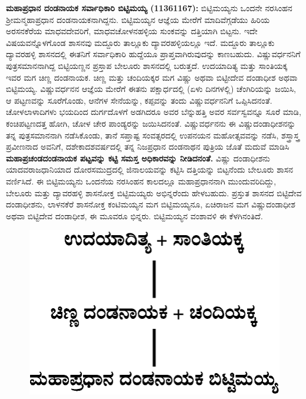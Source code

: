\textbf{ಮಹಾಪ್ರಧಾನ ದಂಡನಾಯಕ ಸರ್ವಾಧಿಕಾರಿ ಬಿಟ್ಟಿಮಯ್ಯ (1136\general{\enginline{-}}1167):} ಬಿಟ್ಟಿಮಯ್ಯನು ಒಂದನೇ ನರಸಿಂಹನ ಶ‍್ರೀಮನ್ಮಹಾಪ್ರಧಾನ ದಂಡನಾಯಕನಾಗಿದ್ದನು. ಬಿಟ್ಟಿಮಯ್ಯನ ಆಜ್ಞೆಯ ಮೇರೆಗೆ ಮಾದಿವೆಗ್ಗಡೆಯು ಹಿರಿಯ ಅರಸನಕೆರೆಯ ಮಾಧವದೇವರಿಗೆ, ಮಾಧವಚೋಳನಹಳ್ಳಿಯ ಸುಂಕವನ್ನು ದತ್ತಿಯಾಗಿ ಬಿಟ್ಟನು. ಇದೇ ವಿಷಯವನ್ನೊಳಗೊಂಡ ಶಾಸನವು ಮದ್ದೂರು ತಾಲ್ಲೂಕು ದ್ಯಾವರಹಳ್ಳಿಯಲ್ಲೂ ಇದೆ. ಮದ್ದೂರು ತಾಲ್ಲೂಕು ದ್ಯಾವರಹಳ್ಳಿ ಶಾಸನದಲ್ಲಿ ಈತನಿಗೆ ಸರ್ವಾಧಿಕಾರಿ ಹುದ್ದೆಯೂ ಪ್ರಾಪ್ತವಾಗಿರುವುದನ್ನು ಕಾಣಬಹುದು. ವಿಷ್ಣುವರ್ಧನನಿಗೆ ಪುತ್ರಸಮಾನನಾಗಿದ್ದ ಬಿಟ್ಟಿಯಣ್ಣನ ಪ್ರಸ್ತಾಪ ಬೇಲೂರು ಶಾಸನದಲ್ಲಿ ಬರುತ್ತದೆ. ಉದಯಾದಿತ್ಯ ಮತ್ತು ಸಾಂತಿಯಕ್ಕ ಇವರ ಮಗ ಚಿಣ್ಣ ದಂಡನಾಯಕ. ಚಿಣ್ಣ ಮತ್ತು ಚಂದಿಯಕ್ಕರ ಮಗ ವಿಷ್ಣು ಅಥವಾ ಬಿಟ್ಟೀದೇವ ದಂಡಾಧೀಶ ಅಥವಾ ಬಿಟ್ಟಿಮಯ್ಯ. ವಿಷ್ಣುವರ್ಧನನ ಆಜ್ಞೆಯ ಮೇರೆಗೆ ಈತನು ಪಕ್ಷಾರ್ಧದಲ್ಲಿ (ಏಳು ದಿನಗಳಲ್ಲಿ) ಚೆಂಗಿರಿಯನ್ನು ಜಯಿಸಿ, ಆ ಪಟ್ಟಣವನ್ನು ಸೂರೆಗೊಂಡು, ಆನೆಗಳ ಸೇನೆಯನ್ನು, ಕಪ್ಪವನ್ನು ತಂದು ವಿಷ್ಣುವರ್ಧನನಿಗೆ ಒಪ್ಪಿಸಿದನಂತೆ. ಚೋಳಲಾಳಾದಿಗಳು ಭಯದಿಂದ ದುರ್ಗದೊಳಗೆ ಅಡಗಿದರೂ ಅವರ ಬೆನ್ನುಹತ್ತಿ ಅವರ ಸರ್ವಸ್ವವನ್ನೂ ಸೂರೆ ಮಾಡಿ, ಕಂಚಿಪಟ್ಟಣದತ್ತ ಹೋಗಿ, ಚೋಳ ಚೇರ ಪಾಂಡ್ಯರನ್ನು ಜಯಿಸಿದನಂತೆ. ವಿಷ್ಣುವರ್ಧನನು ಈ ವಿಷ್ಣುದಂಡಾಧೀಶನನ್ನು ತನ್ನ ಪುತ್ರಸಮಾನನಾಗಿ ನಡೆಸಿಕೊಂಡು, ತಾನೆ ಸಪ್ತಾಷ್ಟ ಸಂವತ್ಸರದಲ್ಲಿ ಉಪನಯನ ಮಹೋತ್ಸವವನ್ನು ನಡೆಸಿ, ಶಸ್ತ್ರಾಸ್ತ್ರ ಪ್ರವೀಣನಾದ ಅವನಿಗೆ, ದಶೇಕಾದಶವರ್ಷದಲ್ಲಿ ತನ್ನ ನಿಜಪ್ರಧಾನ ದಂಡನಾಥನ ಪುತ್ರಿಯ ಜೊತೆ ಮದುವೆ ಮಾಡಿಸಿ \textbf{ಮಹಾಪ್ರಚಂಡದಂಡನಾಯಕ ಪಟ್ಟವನ್ನು ಕಟ್ಟಿ ಸಮಸ್ತ ಅಧಿಕಾರವನ್ನು ನೀಡಿದನಂತೆ.} ವಿಷ್ಣು ದಂಡಾಧೀಶನು ಯಾದವರಾಜಧಾನಿಯಾದ ದೋರಸಮುದ್ರದಲ್ಲಿ ಜಿನಾಲಯವನ್ನು ಕಟ್ಟಿಸಿ ದತ್ತಿಯನ್ನು ಬಿಟ್ಟನೆಂದು ಬೇಲೂರು ಶಾಸನ ವರ್ಣಿಸಿದೆ. ಈ ಬಿಟ್ಟಿಮಯ್ಯನು ಒಂದನೆಯ ನರಸಿಂಹನ ಕಾಲದಲ್ಲೂ ಮಹಾಪ್ರಧಾನನಾಗಿ ಮುಂದುವರಿದಿದ್ದು, ಬೇಲೂರು ಮತ್ತು ದ್ಯಾವರಹಳ್ಳಿ ಶಾಸನೋಕ್ತ ಬಿಟ್ಟಿಮಯ್ಯರು ಅಭಿನ್ನರೆಂದು ಹೇಳಬಹುದು. ಪ್ರಸ್ತುತ ಶಾಸನದ ಬಿಟ್ಟಿದೇವ ದಂಡಾಧೀಶನು, ಲಾಳನಕೆರೆ ಶಾಸನೋಕ್ತ ಕಂಟಿಮಯ್ಯನ ಮಗ ಬಿಟ್ಟಿಮಯ್ಯನೂ, ಏಚಿರಾಜನ ಮಗ ವಿಷ್ಣುದಂಡಾಧೀಶ ಅಥವಾ ಬಿಟ್ಟಿದೇವ ದಂಡಾಧೀಶ, ಈ ಮೂವರೂ ಭಿನ್ನರು. ಬಿಟ್ಟಿಮಯ್ಯನ ವಂಶಾವಳಿ ಈ ಕೆಳಗಿನಂತಿದೆ.

\begin{figure}[!h]
\includegraphics[scale=1.25]{images/chap3/chap3fig17.jpeg}
\end{figure}

